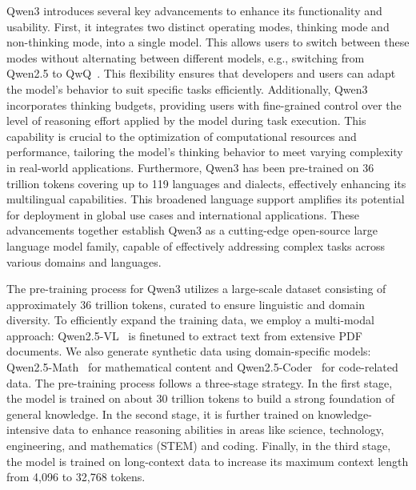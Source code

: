 Qwen3 introduces several key advancements to enhance its functionality and usability. First, it integrates two distinct operating modes, thinking mode and non-thinking mode, into a single model. This allows users to switch between these modes without alternating between different models, e.g., switching from Qwen2.5 to QwQ~\citep{qwq}. This flexibility ensures that developers and users can adapt the model's behavior to suit specific tasks efficiently. Additionally, Qwen3 incorporates thinking budgets, providing users with fine-grained control over the level of reasoning effort applied by the model during task execution. This capability is crucial to the optimization of computational resources and performance, tailoring the model's thinking behavior to meet varying complexity in real-world applications. Furthermore, Qwen3 has been pre-trained on 36 trillion tokens covering up to 119 languages and dialects, effectively enhancing its multilingual capabilities. This broadened language support amplifies its potential for deployment in global use cases and international applications. 
These advancements together establish Qwen3 as a cutting-edge open-source large language model family, capable of effectively addressing complex tasks across various domains and languages.

The pre-training process for Qwen3 utilizes a large-scale dataset consisting of approximately 36 trillion tokens, curated to ensure linguistic and domain diversity. To efficiently expand the training data, we employ a multi-modal approach: Qwen2.5-VL~\citep{qwen2.5vl} is finetuned to extract text from extensive PDF documents. We also generate synthetic data using domain-specific models: Qwen2.5-Math~\citep{qwen2.5math} for mathematical content and Qwen2.5-Coder~\citep{qwen2.5coder} for code-related data. The pre-training process follows a three-stage strategy. In the first stage, the model is trained on about 30 trillion tokens to build a strong foundation of general knowledge. In the second stage, it is further trained on knowledge-intensive data to enhance reasoning abilities in areas like science, technology, engineering, and mathematics (STEM) and coding. Finally, in the third stage, the model is trained on long-context data to increase its maximum context length from 4,096 to 32,768 tokens.

